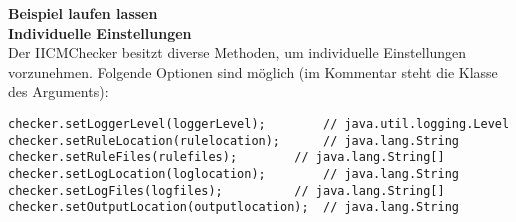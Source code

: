 \textbf{Beispiel laufen lassen}\\

\textbf{Individuelle Einstellungen}\\
Der IICMChecker besitzt diverse Methoden, um individuelle Einstellungen vorzunehmen.
Folgende Optionen sind möglich (im Kommentar steht die Klasse des Arguments):
\begin{verbatim}
checker.setLoggerLevel(loggerLevel);    	// java.util.logging.Level
checker.setRuleLocation(rulelocation);  	// java.lang.String
checker.setRuleFiles(rulefiles);  		// java.lang.String[]
checker.setLogLocation(loglocation);		// java.lang.String
checker.setLogFiles(logfiles);			// java.lang.String[]
checker.setOutputLocation(outputlocation);	// java.lang.String
\end{verbatim}

